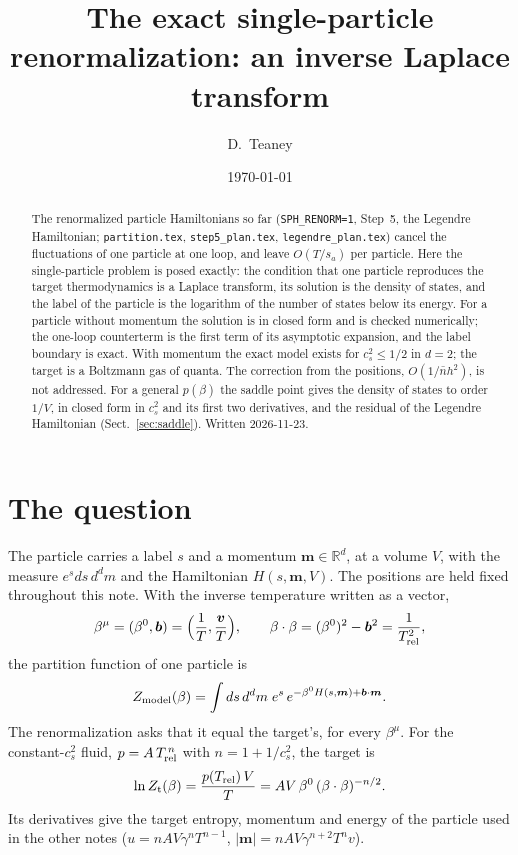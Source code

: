 \documentclass[11pt,aps,preprint,nofootinbib,superscriptaddress,tightenlines]{revtex4-2}
\def\st{\begin{equation}}
\def\stp{\end{equation}}
\def\Sect#1{Sect.~\ref{#1}}
\begin{document}
\sloppy

\title{The exact single-particle renormalization: an inverse Laplace transform}
\author{D.~Teaney}
\date{\today}

\begin{abstract}
The renormalized particle Hamiltonians so far (\texttt{SPH\_RENORM=1}, Step~5, the Legendre Hamiltonian; \nolinkurl{partition.tex},
\nolinkurl{step5_plan.tex}, \nolinkurl{legendre_plan.tex}) cancel the fluctuations of one particle at one loop, and leave $O(T/s_a)$ per particle.
Here the single-particle problem is posed exactly: the condition that one particle reproduces the target thermodynamics is a Laplace transform, its
solution is the density of states, and the label of the particle is the logarithm of the number of states below its energy.  For a particle without
momentum the solution is in closed form and is checked numerically; the one-loop counterterm is the first term of its asymptotic expansion, and the
label boundary is exact.  With momentum the exact model exists for $c_s^2\le1/2$ in $d=2$; the target is a Boltzmann gas of quanta.  The correction
from the positions, $O(1/\bar nh^2)$, is not addressed.  For a general $p(\beta)$ the saddle point gives the density of states to order $1/V$, in closed form in $c_s^2$ and its first two derivatives, and the residual of the Legendre Hamiltonian (\Sect{sec:saddle}).  Written 2026-11-23.
\end{abstract}

\maketitle
\tableofcontents

\section{The question}
\label{sec:question}

The particle carries a label $s$ and a momentum $\bm m\in\mathbb R^d$, at a volume $V$, with the measure $e^{s}ds\,d^dm$ and the Hamiltonian
$H(s,\bm m,V)$.  The positions are held fixed throughout this note.  With the inverse temperature written as a vector,
\st
\beta^\mu=(\beta^0,\bm b)=\Big(\frac1T,\frac{\bm v}T\Big),\qquad \beta\cdot\beta=(\beta^0)^2-\bm b^2=\frac1{T_{\rm rel}^2},
\stp
the partition function of one particle is
\st
Z_{\rm model}(\beta)=\int ds\,d^dm\;e^{s}\,e^{-\beta^0H(s,\bm m)+\bm b\cdot\bm m}.
\label{Zmodel}
\stp
The renormalization asks that it equal the target's, for every $\beta^\mu$.  For the constant-$c_s^2$ fluid, $p=A\,T_{\rm rel}^{\,n}$ with
$n=1+1/c_s^2$, the target is
\st
\ln Z_{\rm t}(\beta)=\frac{p(T_{\rm rel})\,V}{T}=AV\,\beta^0\,(\beta\cdot\beta)^{-n/2} .
\label{Zt}
\stp
Its derivatives give the target entropy, momentum and energy of the particle used in the other notes ($u=nAV\gamma^nT^{n-1}$,
$|\bm m|=nAV\gamma^{n+2}T^nv$).
\end{document}
